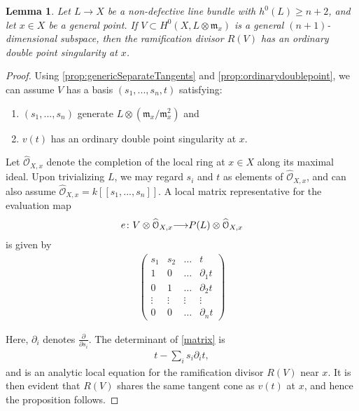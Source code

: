 \documentclass[11pt,reqno]{amsart}
\theoremstyle{plain}
\newtheorem{lemma}[theorem]{Lemma}
\theoremstyle{definition}
\theoremstyle{remark}
\numberwithin{equation}{section}
\renewcommand{\to}{{\longrightarrow}}
\numberwithin{equation}{section}
\renewcommand{\O}{\mathcal O}
\begin{document}
\begin{lemma}\label{lemma:tangentconeRam}
  Let $L \to X$ be a non-defective line bundle with $h^{0}(L) \geq n+2$, and let $x \in X$ be a general point.  If $V \subset H^{0}(X,  L \otimes {\mathfrak m}_{x})$ is a general $(n+1)$-dimensional subspace, then the ramification divisor $R(V)$ has an ordinary double point singularity at $x$. 
\end{lemma}

\begin{proof}
  Using \autoref{prop:genericSeparateTangents} and \autoref{prop:ordinarydoublepoint}, we can assume $V$ has a basis $(s_{1}, ..., s_{n}, t)$ satisfying: 
  \begin{enumerate}
      \item $(s_{1}, ..., s_{n})$ generate $L \otimes ({\mathfrak m}_{x}/{\mathfrak m}^{2}_{x})$ and
      \item $v(t)$ has an ordinary double point singularity at $x$.
    \end{enumerate}  

Let $\widehat{\O}_{X,x}$ denote the completion of the local ring at $x \in X$ along its maximal ideal.  Upon trivializing $L$, we may regard $s_{i}$ and $t$ as elements of $\widehat{\O}_{X,x}$, and can also assume  $\widehat{\O}_{X,x} = k[[s_{1}, ..., s_{n}]]$. A local matrix representative for the evaluation map 
\begin{align*}
  e\from V \otimes \widehat{\O}_{X,x} \to P(L) \otimes \widehat{\O}_{X,x}
\end{align*}
is given by 
\begin{align}\label{matrix}
\begin{pmatrix}
  s_{1} & s_{2} & \dots & t \\
  1 & 0 & \dots & \partial_{1}t \\
  0 & 1 & \dots & \partial_{2}t \\
  \vdots & \vdots & \vdots & \vdots \\
  0 & 0 & \dots & \partial_{n}t
\end{pmatrix}
\end{align}

Here, $\partial_{i}$ denotes $\frac{\partial}{\partial s_{i}}$. The determinant of \ref{matrix} is 
\begin{align*}
  t - \sum_{i}s_{i}\partial_{i}t,
\end{align*}
and is an analytic local equation for the ramification divisor $R(V)$ near $x$.  It is then evident that $R(V)$ shares the same tangent cone as $v(t)$ at $x$, and hence the proposition follows.
\end{proof}
\end{document}
